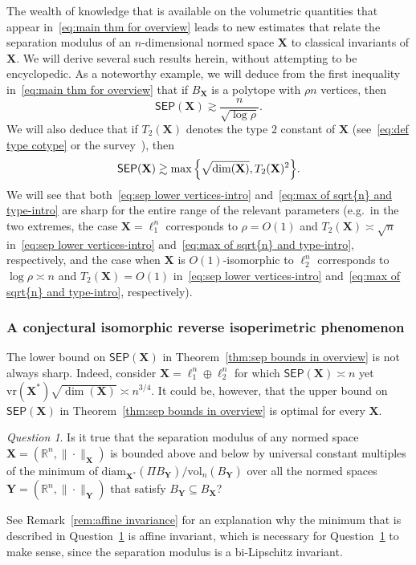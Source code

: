 \documentclass[11pt,reqno]{amsart}
\newcommand{\diam}{\mathrm{diam}}
\newcommand{\vr}{\mathrm{vr}}
\newcommand{\X}{\mathbf X}
\newcommand{\Y}{\mathbf Y}
\newcommand{\R}{\mathbb R}
\theoremstyle{remark}
\newtheorem{question}[theorem]{Question}
\renewcommand{\subset}{\subseteq}
\newcommand{\vol}{\mathrm{vol}}
\renewcommand{\1}{\mathbf 1}
\newcommand{\sep}{\mathsf{SEP}}
\begin{document}
The wealth of knowledge that is available on the volumetric quantities that appear in~\eqref{eq:main thm for overview} leads to new estimates that relate the separation modulus of an $n$-dimensional normed space $\X$ to classical invariants of $\X$. We will derive several such results herein, without attempting to be encyclopedic. As a noteworthy example, we will deduce from the first inequality in~\eqref{eq:main thm for overview} that if $B_\X$ is a polytope with $\rho n$ vertices, then
\begin{equation}\label{eq:sep lower vertices-intro}
\sep(\X)\gtrsim \frac{n}{\sqrt{\log \rho}}.
\end{equation}
We will also deduce that if $T_2(\X)$ denotes the type $2$ constant of $\X$ (see~\eqref{eq:def type cotype} or the survey~\cite{Mau03}), then
\begin{equation}\label{eq:max of sqrt{n} and type-intro}
\sep(\X)\gtrsim \max\Big\{\sqrt{\dim(\X)},T_2(\X)^2\Big\}.
\end{equation}
We will see that both~\eqref{eq:sep lower vertices-intro} and~\eqref{eq:max of sqrt{n} and type-intro} are sharp for the entire range of the relevant parameters (e.g.~in the two extremes, the case $\X=\ell_1^n$ corresponds to $\rho=O(1)$ and $T_2(\X)\asymp\sqrt{n}$ in~\eqref{eq:sep lower vertices-intro} and~\eqref{eq:max of sqrt{n} and type-intro}, respectively, and the case when $\X$ is $O(1)$-isomorphic to $\ell_2^n$ corresponds to $\log \rho\asymp n$ and $T_2(\X)=O(1)$ in~\eqref{eq:sep lower vertices-intro} and~\eqref{eq:max of sqrt{n} and type-intro}, respectively).




\subsubsection{A conjectural isomorphic reverse isoperimetric phenomenon}\label{sec:reverse iso in overview}
The lower bound on $\sep(\X)$ in Theorem~\ref{thm:sep bounds in overview}  is not always sharp. Indeed, consider  $\X=\ell_1^n\oplus \ell_2^n$ for which   $\sep(\X)\asymp n$ yet $\vr(\X^*)\sqrt{\dim(\X)}\asymp n^{3/4}$.  It could be, however, that the upper bound on $\sep(\X)$ in Theorem~\ref{thm:sep bounds in overview} is optimal for every $\X$.


\begin{question}\label{Q:shape optimization} Is it true that the separation modulus of any normed space $\X=(\R^n,\|\cdot\|_\X)$ is bounded above and below by universal constant multiples of the minimum of $\diam_{\X^{\textbf{*}}}(\Pi B_\Y)/\vol_n(B_{\Y})$ over all the  normed spaces $\Y=(\R^n,\|\cdot\|_\Y)$ that satisfy $B_\Y\subset B_\X$?
\end{question}
See Remark~\ref{rem:affine invariance} for an explanation why the minimum that is described in Question~\ref{Q:shape optimization}  is affine invariant, which is necessary for Question~\ref{Q:shape optimization} to make sense, since the separation modulus is a bi-Lipschitz invariant.
\end{document}
